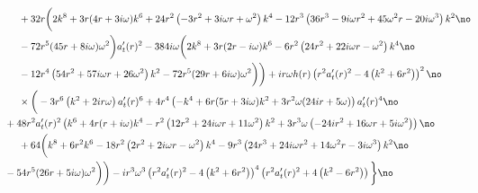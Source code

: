 \documentclass[preprintnumbers,aps,prd,longbibliography,nofootinbib,nobibnotes,amsmath,amssymb]{revtex4}
\begin{document}
\begin{align}
		 &+32 r \bigg(2 k^8+3 r (4 r+3 i \omega ) k^6+24 r^2 \left(-3 r^2+3 i \omega  r+\omega ^2\right) k^4-12 r^3 \left(36 r^3-9 i \omega  r^2+45 \omega ^2 r-20 i \omega ^3\right) k^2\no\\
		 &-72 r^5 (45 r+8 i \omega ) \omega ^2\bigg) a_t'(r)^2-384 i \omega  \bigg(2 k^8+3 r (2 r-i \omega) k^6-6 r^2 \left(24 r^2+22 i \omega  r-\omega ^2\right)k^4\no\\
		 &-12 r^4 \left(54 r^2+57 i \omega  r+26 \omega ^2\right) k^2-72 r^5 (29 r+6 i \omega ) \omega ^2\bigg)\bigg) +i r \omega  h(r) \left(r^2 a_t'(r){}^2-4 \left(k^2+6 r^2\right)\right)^2 \no\\
		 &\times\bigg(-3 r^6 \left(k^2+2 i r \omega \right) a_t'(r)^6+4 r^4 \left(-k^4+6 r (5 r+3 i \omega ) k^2+3 r^2 \omega  (24 i r+5 \omega )\right) a_t'(r)^4\no\\
		 &\hspace{-0.5cm}+48 r^2 a_t'(r)^2\left(k^6+4 r (r+i \omega ) k^4-r^2 \left(12 r^2+24 i \omega  r+11 \omega ^2\right) k^2+3 r^3 \omega  \left(-24 i r^2+16 \omega  r+5 i \omega ^2\right)\right) \no\\
		 &+64 \bigg(k^8+6 r^2 k^6-18 r^2 \left(2 r^2+2 i \omega  r-\omega^2\right) k^4-9 r^3 \left(24 r^3+24 i \omega  r^2+14 \omega ^2 r-3 i \omega ^3\right) k^2\no\\
		 &\hspace{-0.5cm}-54 r^5 (26 r+5 i \omega ) \omega^2\bigg)\bigg) -i r^3 \omega^3 \left(r^2 a_t'(r)^2-4 \left(k^2+6 r^2\right)\right)^4 \left(r^2 a_t'(r)^2+4 \left(k^2-6 r^2\right)\right)\bigg\}\no\\
	\end{align}
\end{document}

